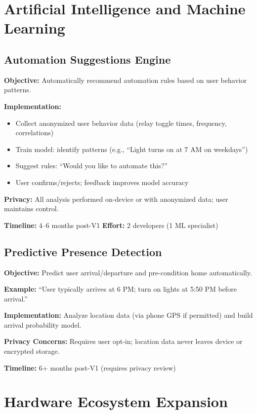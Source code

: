 \section{Artificial Intelligence and Machine Learning}

\subsection{Automation Suggestions Engine}

\textbf{Objective:} Automatically recommend automation rules based on user behavior patterns.

\textbf{Implementation:}
\begin{itemize}
    \item Collect anonymized user behavior data (relay toggle times, frequency, correlations)
    \item Train model: identify patterns (e.g., ``Light turns on at 7 AM on weekdays'')
    \item Suggest rules: ``Would you like to automate this?''
    \item User confirms/rejects; feedback improves model accuracy
\end{itemize}

\textbf{Privacy:} All analysis performed on-device or with anonymized data; user maintains control.

\textbf{Timeline:} 4–6 months post-V1
\textbf{Effort:} 2 developers (1 ML specialist)

\subsection{Predictive Presence Detection}

\textbf{Objective:} Predict user arrival/departure and pre-condition home automatically.

\textbf{Example:} ``User typically arrives at 6 PM; turn on lights at 5:50 PM before arrival.''

\textbf{Implementation:} Analyze location data (via phone GPS if permitted) and build arrival probability model.

\textbf{Privacy Concerns:} Requires user opt-in; location data never leaves device or encrypted storage.

\textbf{Timeline:} 6+ months post-V1 (requires privacy review)

\section{Hardware Ecosystem Expansion}

